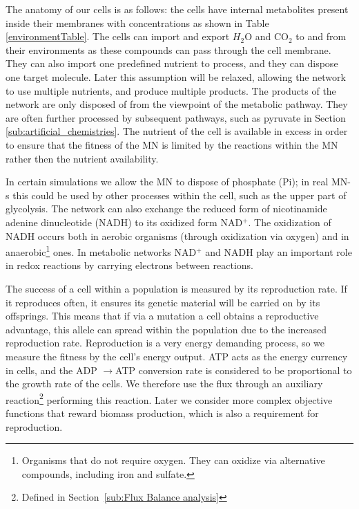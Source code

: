 \documentclass[a4paper,12pt]{article}
\begin{document}
	The anatomy of our cells is as follows: the cells have internal metabolites present inside their membranes with concentrations as shown in Table \ref{environmentTable}. The cells can import and export $H_2$O and CO$_2$ to and from their environments as these compounds can pass through the cell membrane. They can also import one predefined nutrient to process, and they can dispose one target molecule. Later this assumption will be relaxed, allowing the network to use multiple nutrients, and produce multiple products. The products of the network are only disposed of from the viewpoint of the metabolic pathway. They are often further processed by subsequent pathways, such as pyruvate in Section \ref{sub:artificial_chemistries}. The nutrient of the cell is available in excess in order to ensure that the fitness of the MN is limited by the reactions within the MN rather then the nutrient availability. 
	
	In certain simulations we allow the MN to dispose of phosphate (Pi); in real MN-s this could be used by other processes within the cell, such as the upper part of glycolysis. The network can also exchange the reduced form of nicotinamide adenine dinucleotide (NADH) to its oxidized form NAD$^+$. The oxidization of NADH occurs both in aerobic organisms (through oxidization via oxygen) and in anaerobic\footnote{ Organisms that do not require oxygen. They can oxidize via alternative compounds, including iron and sulfate.} ones. In metabolic networks NAD$^+$ and NADH play an important role in redox reactions by carrying electrons between reactions\cite{principlesofbio}.

	The success of a cell within a population is measured by its reproduction rate. If it reproduces often, it ensures its genetic material will be carried on by its offsprings. This means that if via a mutation a cell obtains a reproductive advantage, this allele can spread within the population due to the increased reproduction rate. Reproduction is a very energy demanding process, so we measure the fitness by the cell's energy output. ATP acts as the energy currency in cells, and the ADP $\rightarrow$ATP conversion rate is considered to be proportional to the growth rate of the cells. We therefore use the flux through an auxiliary reaction\footnote{Defined in Section~\ref{sub:Flux Balance analysis}} performing this reaction. Later we consider more complex objective functions that reward biomass production, which is also a requirement for reproduction. 
\end{document}
